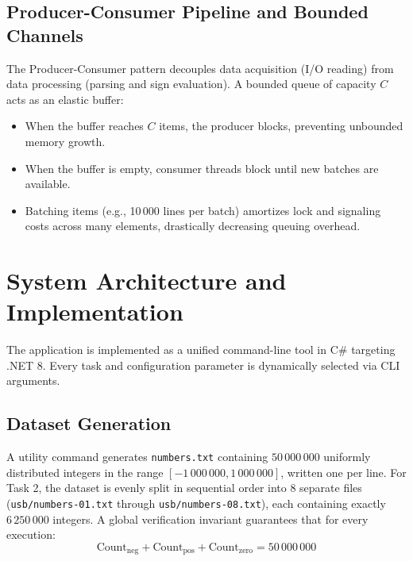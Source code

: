 \documentclass[12pt,a4paper]{article}
\begin{document}
\subsection{Producer-Consumer Pipeline and Bounded Channels}
The Producer-Consumer pattern decouples data acquisition (I/O reading) from data processing (parsing and sign evaluation). 
A bounded queue of capacity $C$ acts as an elastic buffer:
\begin{itemize}
    \item When the buffer reaches $C$ items, the producer blocks, preventing unbounded memory growth.
    \item When the buffer is empty, consumer threads block until new batches are available.
    \item Batching items (e.g., 10\,000 lines per batch) amortizes lock and signaling costs across many elements, drastically decreasing queuing overhead.
\end{itemize}

\section{System Architecture and Implementation}

The application is implemented as a unified command-line tool in C\# targeting .NET 8. Every task and configuration parameter is dynamically selected via CLI arguments.

\subsection{Dataset Generation}
A utility command generates \texttt{numbers.txt} containing $50\,000\,000$ uniformly distributed integers in the range $[-1\,000\,000, 1\,000\,000]$, written one per line. For Task 2, the dataset is evenly split in sequential order into 8 separate files (\texttt{usb/numbers-01.txt} through \texttt{usb/numbers-08.txt}), each containing exactly $6\,250\,000$ integers.
A global verification invariant guarantees that for every execution:
\begin{equation}
    \text{Count}_{\text{neg}} + \text{Count}_{\text{pos}} + \text{Count}_{\text{zero}} = 50\,000\,000
\end{equation}
\end{document}
